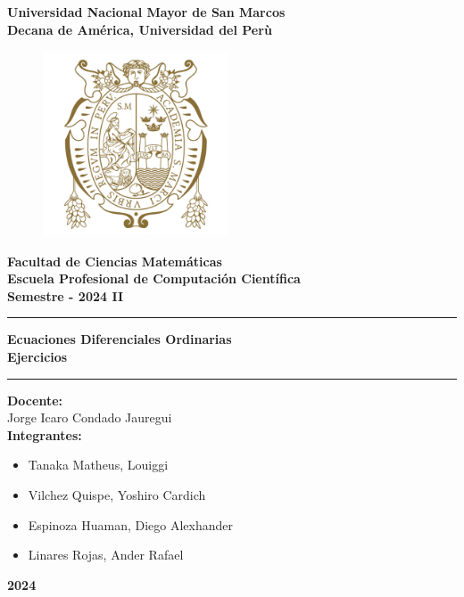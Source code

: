 \begin{titlepage}
  \begin{center}
  { \LARGE\textbf{Universidad Nacional Mayor de San Marcos}}\\
   \vspace{2.5mm}
  {\large \textbf{Decana de América, Universidad del Perù}}\\
    \vspace{2.5mm}
    \begin{figure}[h]
        \centering
        \includegraphics[height=5.5cm]{include/logo.png}
    \end{figure}
  { \Large\textbf{Facultad de Ciencias Matemáticas}}\\
   \vspace{2.5mm}
  { \large\textbf{Escuela Profesional de Computación Científica}}\\
 \vspace{2.5mm}
{ \large\textbf{Semestre - 2024 II}}\\
{\rule{\linewidth}{0.55mm}} 
 { \Large\textbf{Ecuaciones Diferenciales Ordinarias\\ Ejercicios}}\\
{\rule{\linewidth}{0.55mm}} 
{ \large\textbf{Docente:\\}Jorge Icaro Condado Jauregui}\\ \vspace{2.5mm}
{ \large\textbf{Integrantes: }}
\begin{itemize}
    \item Tanaka Matheus, Louiggi 
    \item Vilchez Quispe, Yoshiro Cardich 
    \item Espinoza Huaman, Diego Alexhander 
    \item Linares Rojas, Ander Rafael 

\end{itemize}
\vfill
{\huge\textbf{2024}}
\end{center}
\end{titlepage}
